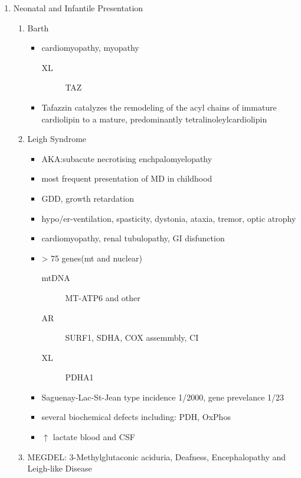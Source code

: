 \documentclass{scrartcl}
\begin{document}
\begin{enumerate}
\item Neonatal and Infantile Presentation
\label{sec:org604fcd7}
\begin{enumerate}
\item Barth
\label{sec:orgdc3802a}
\begin{itemize}
\item cardiomyopathy, myopathy
\begin{description}
\item[{XL}] TAZ
\end{description}
\item Tafazzin catalyzes the remodeling of the acyl chains of immature
cardiolipin to a mature, predominantly tetralinoleylcardiolipin
\end{itemize}
\item Leigh Syndrome
\label{sec:org8e6587e}
\begin{itemize}
\item AKA:subacute necrotising enchpalomyelopathy
\item most frequent presentation of MD in childhood
\item GDD, growth retardation
\item hypo/er-ventilation, spasticity, dystonia, ataxia, tremor, optic atrophy
\item cardiomyopathy, renal tubulopathy, GI disfunction
\item \textgreater{} 75 genes(mt and nuclear)
\begin{description}
\item[{mtDNA}] MT-ATP6 and other
\item[{AR}] SURF1, SDHA, COX assemmbly, CI
\item[{XL}] PDHA1
\end{description}
\item Saguenay-Lac-St-Jean type incidence 1/2000, gene prevelance 1/23
\item several biochemical defects including: PDH, OxPhos
\item \(\uparrow\) lactate blood and CSF
\end{itemize}
\item MEGDEL: 3-Methylglutaconic aciduria, Deafness, Encephalopathy and Leigh-like Disease
\label{sec:org2a2ca5e}
\end{enumerate}
\end{enumerate}
\end{document}
